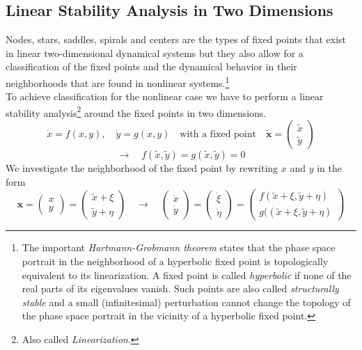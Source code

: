 \subsection{Linear Stability Analysis in Two Dimensions}
Nodes, stars, saddles, spirals and centers are the types of fixed points that exist in linear two-dimensional dynamical systems but they also allow for a classification of the fixed points and the dynamical behavior in their neighborhoods that are found in nonlinear systems.\footnote{The important \emph{Hartmann-Grobmann theorem} states that the phase space portrait in the neighborhood of a hyperbolic fixed point is topologically equivalent to its linearization. A fixed point is called \emph{hyperbolic} if none of the real parts of its eigenvalues vanish. Such points are also called \emph{structurally stable} and a small (infinitesimal) perturbation cannot change the topology of the phase space portrait in the vicinity of a hyperbolic fixed point.}\\
To achieve classification for the nonlinear case we have to perform a linear stability analysis\footnote{Also called \emph{Linearization}.} around the fixed points in two dimensions.
\begin{equation}
	\dot{x}=f(x,y),\quad\dot{y}=g(x,y)\quad\text{with a fixed point}\quad\mathbf{\tilde{x}}=
	\begin{pmatrix}
		\tilde{x}\\\tilde{y}
	\end{pmatrix}
\end{equation}
\begin{equation*}
	\rightarrow\quad f(\tilde{x},\tilde{y})=g(\tilde{x},\tilde{y})=0
\end{equation*}
We investigate the neighborhood of the fixed point by rewriting $x$ and $y$ in the form
\begin{equation}
	\mathbf{x}=
	\begin{pmatrix}
		x\\y
	\end{pmatrix}=
	\begin{pmatrix}
		\tilde{x}+\xi\\\tilde{y}+\eta
	\end{pmatrix}\quad\rightarrow\quad
	\begin{pmatrix}
		\dot{x}\\\dot{y}
	\end{pmatrix}=
	\begin{pmatrix}
		\dot{\xi}\\\dot{\eta}
	\end{pmatrix}=
	\begin{pmatrix}
		f(\tilde{x}+\xi, \tilde{y}+\eta)\\g((\tilde{x}+\xi, \tilde{y}+\eta)
	\end{pmatrix}
\end{equation}
